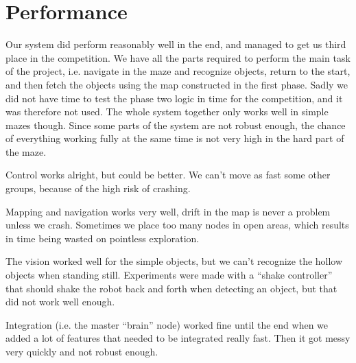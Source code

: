\section{Performance}
Our system did perform reasonably well in the end, and managed to get us third place in the competition. 
We have all the parts required to perform the main task of the project, i.e. navigate in the maze and recognize objects, return to the start, and then fetch the objects using the map constructed in the first phase. 
Sadly we did not have time to test the phase two logic in time for the competition, and it was therefore not used.
The whole system together only works well in simple mazes though. 
Since some parts of the system are not robust enough, the chance of everything working fully at the same time is not very high in the hard part of the maze. 

Control works alright, but could be better. 
We can't move as fast some other groups, because of the high risk of crashing. 

Mapping and navigation works very well, drift in the map is never a problem unless we crash. Sometimes we place too many nodes in open areas, which results in time being wasted on pointless exploration.

The vision worked well for the simple objects, but we can't recognize the hollow objects when standing still. 
Experiments were made with a ``shake controller'' that should shake the robot back and forth when detecting an object, but that did not work well enough.

Integration (i.e. the master ``brain'' node) worked fine until the end when we added a lot of features that needed to be integrated really fast. Then it got messy very quickly and not robust enough.
